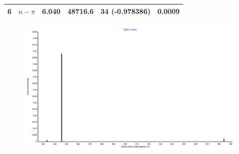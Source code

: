 \begin{table}[H]
\begin{center}
{\begin{tabular}{|c|c|c|c|c|c|}
    6 & $n-\pi$ & 6.040 & 48716.6 & 34 \rightarrow 37 (-0.978386) & 0.0009 \\ \hline
    \end{tabular}%
    }
    \end{center}
\end{table}

\begin{figure}[H]
    \centering
    \captionsetup{justification=centering}
    \includegraphics[scale=0.4]{fig/2}
\end{figure}